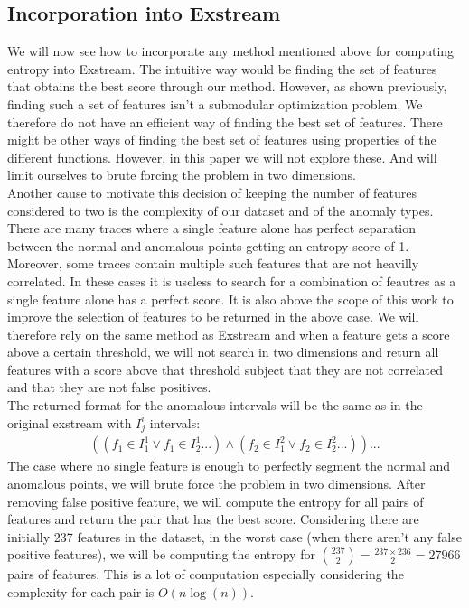 \documentclass[oneside, a4paper, onecolumn, 11pt]{article}
\begin{document}
\subsection{Incorporation into Exstream}
We will now see how to incorporate any method mentioned above for computing entropy into Exstream. The intuitive way would be finding the set of features that obtains the best score through our method. However, as shown previously, finding such a set of features isn't a submodular optimization problem. We therefore do not have an efficient way of finding the best set of features. There might be other ways of finding the best set of features using properties of the different functions. However, in this paper we will not explore these. And will limit ourselves to brute forcing the problem in two dimensions.\\
Another cause to motivate this decision of keeping the number of features considered to two is the complexity of our dataset and of the anomaly types. There are many traces where a single feature alone has perfect separation between the normal and anomalous points getting an entropy score of 1. Moreover, some traces contain multiple such features that are not heavilly correlated. In these cases it is useless to search for a combination of feautres as a single feature alone has a perfect score. It is also above the scope of this work to improve the selection of features to be returned in the above case. We will therefore rely on the same method as Exstream and when a feature gets a score above a certain threshold, we will not search in two dimensions and return all features with a score above that threshold subject that they are not correlated and that they are not false positives.\\
The returned format for the anomalous intervals will be the same as in the original exstream with $I^i_j$ intervals: 
\begin{align*}
  ((f_1 \in I^1_1 \lor f_1 \in I^1_2 ...) \land (f_2 \in I^2_1 \lor f_2 \in I^2_2 ...)) ...
\end{align*}
The case where no single feature is enough to perfectly segment the normal and anomalous points, we will brute force the problem in two dimensions. After removing false positive feature, we will compute the entropy for all pairs of features and return the pair that has the best score. Considering there are initially 237 features in the dataset, in the worst case (when there aren't any false positive features), we will be computing the entropy for ${237\choose2} = \frac{237 \times 236}{2} = 27966$ pairs of features. This is a lot of computation especially considering the complexity for each pair is $O(n \log(n))$. \\
\end{document}
